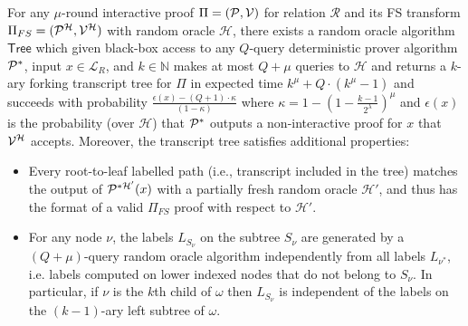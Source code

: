 \begin{lemma} \label{lem:FSSoundness}
	For any $\mu$-round interactive proof $\Pi = (\mathcal{P}, \mathcal{V})$ for relation $\mathcal{R}$ and its FS transform $\Pi_{FS} = (\mathcal{P}^\mathcal{H}, \mathcal{V}^\mathcal{H})$ with random oracle $\mathcal{H}$, there exists a random oracle algorithm $\textsf{Tree}$ which given black-box access to any $Q$-query deterministic prover algorithm $\mathcal{P}^*$, input $x \in \mathcal{L}_R$, and $k \in \mathbb{N}$ makes at most $Q+\mu$ queries to $\mathcal{H}$ and returns a $k$-ary forking transcript tree for $\Pi$ in expected time $k^\mu + Q \cdot (k^\mu - 1)$ and succeeds with probability $\frac{\epsilon(x) - (Q+1) \cdot \kappa }{(1 - \kappa)}$ where $\kappa = 1 - (1 - \frac{k-1}{2^\lambda})^\mu$ and $\epsilon(x)$ is the probability (over $\mathcal{H}$) that $\mathcal{P}^*$ outputs a non-interactive proof for $x$ that $\mathcal{V}^\mathcal{H}$ accepts. Moreover, the transcript tree satisfies additional properties: 
	\begin{itemize}
	\item Every root-to-leaf labelled path (i.e., transcript included in the tree) matches the output of $\mathcal{P}^{*\mathcal{H}'}(x)$ with a partially fresh random oracle $\mathcal{H}'$, and thus has the format of a valid $\Pi_{FS}$ proof with respect to $\mathcal{H}'$.  
	\item For any node $\nu$, the labels $L_{S_\nu}$ on the subtree $S_\nu$ are generated by a $(Q+\mu)$-query random oracle algorithm independently from all labels $L_{\nu^*}$, i.e. labels computed on lower indexed nodes that do not belong to $S_\nu$. In particular, if $\nu$ is the $k$th child of $\omega$ then $L_{S_\nu}$ is independent of the labels on the $(k-1)$-ary left subtree of $\omega$.  
	\end{itemize}
\end{lemma}

